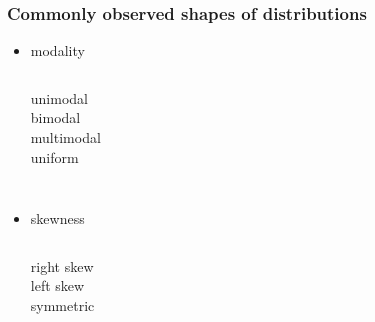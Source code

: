 \documentclass[slidestop,compress,mathserif]{beamer}
\begin{document}
\begin{frame}
\frametitle{Commonly observed shapes of distributions}

\begin{itemize}

\item modality \\
$\:$ \\
\pause

\begin{columns}[c]
unimodal \\
\pause
{}
bimodal \\
\pause
{}
multimodal \\
\pause
{}
uniform
\end{columns}

\pause

$\:$ \\

\item skewness \\
$\:$ \\
\pause

\begin{columns}[c]
right skew \\
\pause
{}
left skew \\
\pause
{}
symmetric \\
\end{columns}

\end{itemize}

\end{frame}

\end{document}
